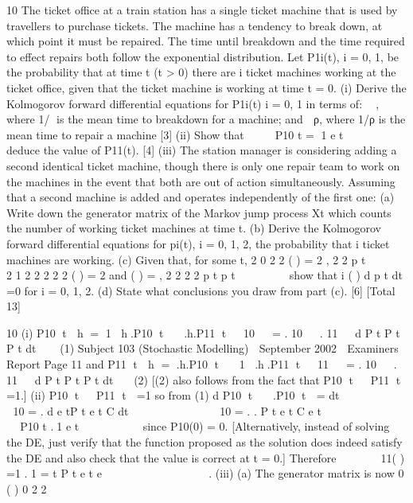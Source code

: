 \documentclass[a4paper,12pt]{article}
\begin{document}
\begin{enumerate}
10 The ticket office at a train station has a single ticket machine that is used by travellers
to purchase tickets.
The machine has a tendency to break down, at which point it must be repaired. The
time until breakdown and the time required to effect repairs both follow the
exponential distribution.
Let P1i(t), i = 0, 1, be the probability that at time t (t > 0) there are i ticket machines
working at the ticket office, given that the ticket machine is working at time t = 0.
(i) Derive the Kolmogorov forward differential equations for P1i(t) i = 0, 1 in
terms of:
  , where 1/ is the mean time to breakdown for a machine; and
  ρ, where 1/ρ is the mean time to repair a machine [3]
(ii) Show that     P10 t = 1 e t    


deduce the value of P11(t). [4]
(iii) The station manager is considering adding a second identical ticket machine,
though there is only one repair team to work on the machines in the event that
both are out of action simultaneously. Assuming that a second machine is
added and operates independently of the first one:
(a) Write down the generator matrix of the Markov jump process Xt which
counts the number of working ticket machines at time t.
(b) Derive the Kolmogorov forward differential equations for pi(t), i = 0,
1, 2, the probability that i ticket machines are working.
(c) Given that, for some t,
2
0 2 2
( ) = 2 ,
2 2
p t 
  
2
1 2 2 2 2 2
( ) = 2 and ( ) = ,
2 2 2 2
p t p t  
     
show that i ( )
d p t
dt
=0 for i = 0, 1, 2.
(d) State what conclusions you draw from part (c). [6]
[Total 13]


10 (i) P10 t  h = 1 h.P10 t   .h.P11 t 
 10   = . 10   . 11   d P t P t P t
dt   (1)
Subject 103 (Stochastic Modelling)  September 2002  Examiners Report
Page 11
and
P11 t  h = .h.P10 t   1 .h.P11 t 
 11   = . 10   . 11   d P t P t P t
dt   (2)
[(2) also follows from the fact that P10 t   P11 t  =1.]
(ii) P10 t   P11 t  =1
so from (1) d P10 t   .P10 t  =
dt   

     
10 = . d e tP t e t C
dt
 
 
      
10 = . . P t e t C e t    


     P10 t .1 e t    
 

since P10(0) = 0.
[Alternatively, instead of solving the DE, just verify that the function
proposed as the solution does indeed satisfy the DE and also check that the
value is correct at t = 0.]
Therefore
   
 
11( ) =1 . 1 =
t
P t e t e
 
     
 
 
.
(iii) (a) The generator matrix is now
0
( )
0 2 2
   
         
    	 


\end{enumerate}
\end{document}
